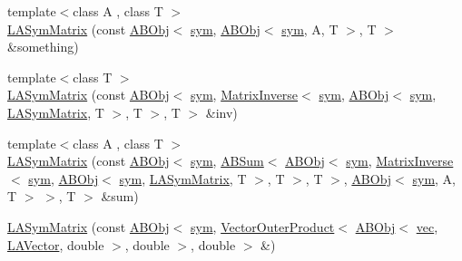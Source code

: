 \begin{DoxyCompactItemize}
\item 
{\footnotesize template$<$class A , class T $>$ }\\\mbox{\hyperlink{classROOT_1_1Minuit2_1_1LASymMatrix_ac807736f91c64875cb01e13050a6c925}{L\+A\+Sym\+Matrix}} (const \mbox{\hyperlink{classROOT_1_1Minuit2_1_1ABObj}{A\+B\+Obj}}$<$ \mbox{\hyperlink{classROOT_1_1Minuit2_1_1sym}{sym}}, \mbox{\hyperlink{classROOT_1_1Minuit2_1_1ABObj}{A\+B\+Obj}}$<$ \mbox{\hyperlink{classROOT_1_1Minuit2_1_1sym}{sym}}, A, T $>$, T $>$ \&something)
\item 
{\footnotesize template$<$class T $>$ }\\\mbox{\hyperlink{classROOT_1_1Minuit2_1_1LASymMatrix_a0089b4055d0d08767d7072657b6f87d5}{L\+A\+Sym\+Matrix}} (const \mbox{\hyperlink{classROOT_1_1Minuit2_1_1ABObj}{A\+B\+Obj}}$<$ \mbox{\hyperlink{classROOT_1_1Minuit2_1_1sym}{sym}}, \mbox{\hyperlink{classROOT_1_1Minuit2_1_1MatrixInverse}{Matrix\+Inverse}}$<$ \mbox{\hyperlink{classROOT_1_1Minuit2_1_1sym}{sym}}, \mbox{\hyperlink{classROOT_1_1Minuit2_1_1ABObj}{A\+B\+Obj}}$<$ \mbox{\hyperlink{classROOT_1_1Minuit2_1_1sym}{sym}}, \mbox{\hyperlink{classROOT_1_1Minuit2_1_1LASymMatrix}{L\+A\+Sym\+Matrix}}, T $>$, T $>$, T $>$ \&inv)
\item 
{\footnotesize template$<$class A , class T $>$ }\\\mbox{\hyperlink{classROOT_1_1Minuit2_1_1LASymMatrix_a50ecd9916b1ca8941c767d16dbdb9b65}{L\+A\+Sym\+Matrix}} (const \mbox{\hyperlink{classROOT_1_1Minuit2_1_1ABObj}{A\+B\+Obj}}$<$ \mbox{\hyperlink{classROOT_1_1Minuit2_1_1sym}{sym}}, \mbox{\hyperlink{classROOT_1_1Minuit2_1_1ABSum}{A\+B\+Sum}}$<$ \mbox{\hyperlink{classROOT_1_1Minuit2_1_1ABObj}{A\+B\+Obj}}$<$ \mbox{\hyperlink{classROOT_1_1Minuit2_1_1sym}{sym}}, \mbox{\hyperlink{classROOT_1_1Minuit2_1_1MatrixInverse}{Matrix\+Inverse}}$<$ \mbox{\hyperlink{classROOT_1_1Minuit2_1_1sym}{sym}}, \mbox{\hyperlink{classROOT_1_1Minuit2_1_1ABObj}{A\+B\+Obj}}$<$ \mbox{\hyperlink{classROOT_1_1Minuit2_1_1sym}{sym}}, \mbox{\hyperlink{classROOT_1_1Minuit2_1_1LASymMatrix}{L\+A\+Sym\+Matrix}}, T $>$, T $>$, T $>$, \mbox{\hyperlink{classROOT_1_1Minuit2_1_1ABObj}{A\+B\+Obj}}$<$ \mbox{\hyperlink{classROOT_1_1Minuit2_1_1sym}{sym}}, A, T $>$ $>$, T $>$ \&sum)
\item 
\mbox{\hyperlink{classROOT_1_1Minuit2_1_1LASymMatrix_ab3813da18be7a37100a8f9c7cd49caf3}{L\+A\+Sym\+Matrix}} (const \mbox{\hyperlink{classROOT_1_1Minuit2_1_1ABObj}{A\+B\+Obj}}$<$ \mbox{\hyperlink{classROOT_1_1Minuit2_1_1sym}{sym}}, \mbox{\hyperlink{classROOT_1_1Minuit2_1_1VectorOuterProduct}{Vector\+Outer\+Product}}$<$ \mbox{\hyperlink{classROOT_1_1Minuit2_1_1ABObj}{A\+B\+Obj}}$<$ \mbox{\hyperlink{classROOT_1_1Minuit2_1_1vec}{vec}}, \mbox{\hyperlink{classROOT_1_1Minuit2_1_1LAVector}{L\+A\+Vector}}, double $>$, double $>$, double $>$ \&)

\end{DoxyCompactItemize}
